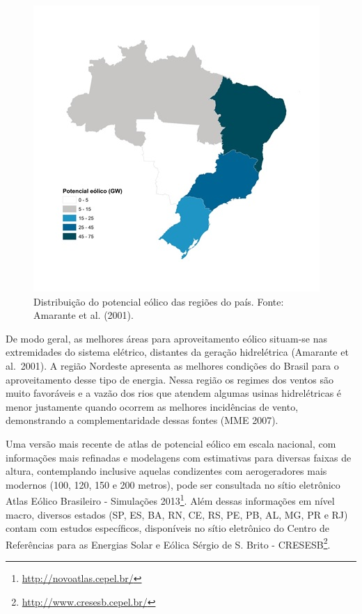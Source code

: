 \documentclass[
  oneside]{scrbook}
\DeclareRobustCommand{\href}[2]{#2\footnote{\url{#1}}}
\begin{document}
\begin{figure}[H]

{\centering \includegraphics[width=0.7\linewidth]{imagens/cap01/Figura_1.2} 

}

\caption{Distribuição do potencial eólico das regiões do país. Fonte: Amarante et al. (2001).}\label{fig:02}
\end{figure}

De modo geral, as melhores áreas para aproveitamento eólico situam-se nas extremidades do sistema elétrico, distantes da geração hidrelétrica (Amarante et al.~2001). A região Nordeste apresenta as melhores condições do Brasil para o aproveitamento desse tipo de energia. Nessa região os regimes dos ventos são muito favoráveis e a vazão dos rios que atendem algumas usinas hidrelétricas é menor justamente quando ocorrem as melhores incidências de vento, demonstrando a complementaridade dessas fontes (MME 2007).

Uma versão mais recente de atlas de potencial eólico em escala nacional, com informações mais refinadas e modelagens com estimativas para diversas faixas de altura, contemplando inclusive aquelas condizentes com aerogeradores mais modernos (100, 120, 150 e 200 metros), pode ser consultada no sítio eletrônico \href{http://novoatlas.cepel.br/}{Atlas Eólico Brasileiro - Simulações 2013}. Além dessas informações em nível macro, diversos estados (SP, ES, BA, RN, CE, RS, PE, PB, AL, MG, PR e RJ) contam com estudos específicos, disponíveis no sítio eletrônico do \href{http://www.cresesb.cepel.br/}{Centro de Referências para as Energias Solar e Eólica Sérgio de S. Brito - CRESESB}.
\end{document}
